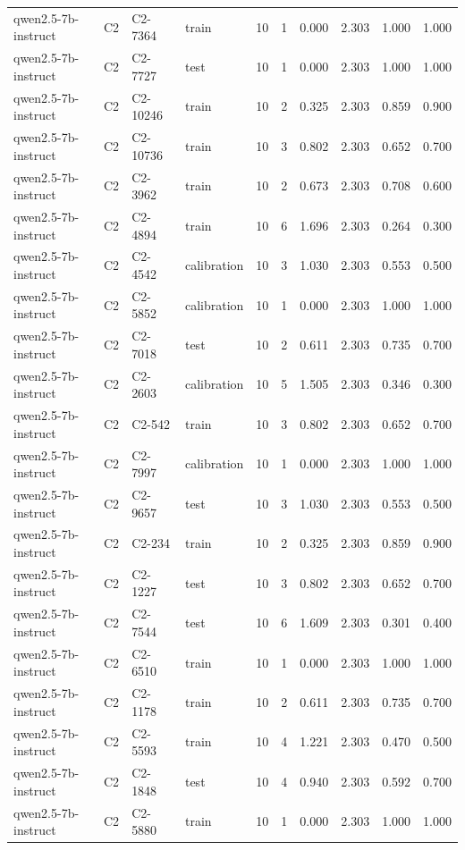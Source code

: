 \begin{table}
\begin{tabular}{llllrrrrrr}
qwen2.5-7b-instruct & C2 & C2-7364 & train & 10 & 1 & 0.000 & 2.303 & 1.000 & 1.000 \\
qwen2.5-7b-instruct & C2 & C2-7727 & test & 10 & 1 & 0.000 & 2.303 & 1.000 & 1.000 \\
qwen2.5-7b-instruct & C2 & C2-10246 & train & 10 & 2 & 0.325 & 2.303 & 0.859 & 0.900 \\
qwen2.5-7b-instruct & C2 & C2-10736 & train & 10 & 3 & 0.802 & 2.303 & 0.652 & 0.700 \\
qwen2.5-7b-instruct & C2 & C2-3962 & train & 10 & 2 & 0.673 & 2.303 & 0.708 & 0.600 \\
qwen2.5-7b-instruct & C2 & C2-4894 & train & 10 & 6 & 1.696 & 2.303 & 0.264 & 0.300 \\
qwen2.5-7b-instruct & C2 & C2-4542 & calibration & 10 & 3 & 1.030 & 2.303 & 0.553 & 0.500 \\
qwen2.5-7b-instruct & C2 & C2-5852 & calibration & 10 & 1 & 0.000 & 2.303 & 1.000 & 1.000 \\
qwen2.5-7b-instruct & C2 & C2-7018 & test & 10 & 2 & 0.611 & 2.303 & 0.735 & 0.700 \\
qwen2.5-7b-instruct & C2 & C2-2603 & calibration & 10 & 5 & 1.505 & 2.303 & 0.346 & 0.300 \\
qwen2.5-7b-instruct & C2 & C2-542 & train & 10 & 3 & 0.802 & 2.303 & 0.652 & 0.700 \\
qwen2.5-7b-instruct & C2 & C2-7997 & calibration & 10 & 1 & 0.000 & 2.303 & 1.000 & 1.000 \\
qwen2.5-7b-instruct & C2 & C2-9657 & test & 10 & 3 & 1.030 & 2.303 & 0.553 & 0.500 \\
qwen2.5-7b-instruct & C2 & C2-234 & train & 10 & 2 & 0.325 & 2.303 & 0.859 & 0.900 \\
qwen2.5-7b-instruct & C2 & C2-1227 & test & 10 & 3 & 0.802 & 2.303 & 0.652 & 0.700 \\
qwen2.5-7b-instruct & C2 & C2-7544 & test & 10 & 6 & 1.609 & 2.303 & 0.301 & 0.400 \\
qwen2.5-7b-instruct & C2 & C2-6510 & train & 10 & 1 & 0.000 & 2.303 & 1.000 & 1.000 \\
qwen2.5-7b-instruct & C2 & C2-1178 & train & 10 & 2 & 0.611 & 2.303 & 0.735 & 0.700 \\
qwen2.5-7b-instruct & C2 & C2-5593 & train & 10 & 4 & 1.221 & 2.303 & 0.470 & 0.500 \\
qwen2.5-7b-instruct & C2 & C2-1848 & test & 10 & 4 & 0.940 & 2.303 & 0.592 & 0.700 \\
qwen2.5-7b-instruct & C2 & C2-5880 & train & 10 & 1 & 0.000 & 2.303 & 1.000 & 1.000 \\

\end{tabular}
\end{table}
